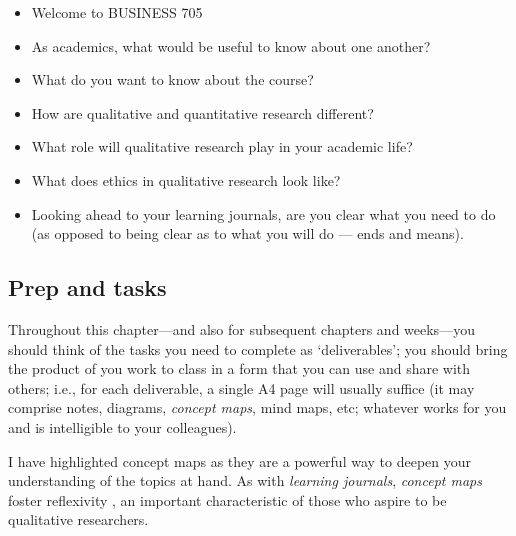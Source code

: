 \documentclass[]{book}
\theoremstyle{definition}
\theoremstyle{definition}
\theoremstyle{definition}
\theoremstyle{remark}
\begin{document}
\begin{itemize}
\item
  Welcome to BUSINESS 705
\item
  As academics, what would be useful to know about one another?
\item
  What do you want to know about the course?
\item
  How are qualitative and quantitative research different?
\item
  What role will qualitative research play in your academic life?
\item
  What does ethics in qualitative research look like?
\item
  Looking ahead to your learning journals, are you clear what you need
  to do (as opposed to being clear as to what you will do --- ends and
  means).
\end{itemize}

\hypertarget{prep-and-tasks}{%
\subsection*{Prep and tasks}\label{prep-and-tasks}}

Throughout this chapter---and also for subsequent chapters and
weeks---you should think of the tasks you need to complete as
`deliverables'; you should bring the product of you work to class in a
form that you can use and share with others; i.e., for each deliverable,
a single A4 page will usually suffice (it may comprise notes, diagrams,
\emph{concept maps}, mind maps, etc; whatever works for you and is
intelligible to your colleagues).

I have highlighted concept maps as they are a powerful way to deepen
your understanding of the topics at hand. As with \emph{learning
journals}, \emph{concept maps} foster reflexivity
\autocite{hibbert_2010_reflexivityrecursionrelationality}, an important
characteristic of those who aspire to be qualitative researchers.
\end{document}
